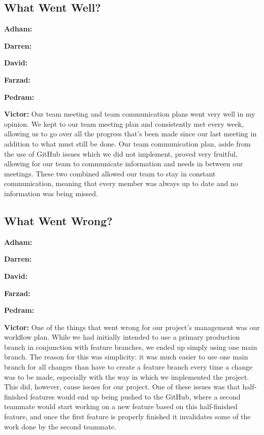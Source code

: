 \documentclass{article}
\begin{document}
\subsection{What Went Well?}

\textbf{Adham:}

\textbf{Darren:}

\textbf{David:}

\textbf{Farzad:}

\textbf{Pedram:}

\textbf{Victor:} Our team meeting and team communication plans went very well in my opinion. We kept to our team meeting plan and consistently met every week, allowing us to go over all the progress that's been made since our last meeting in addition to what must still be done. Our team communication plan, aside from the use of GitHub issues which we did not implement, proved very fruitful, allowing for our team to communicate information and needs in between our meetings. These two combined allowed our team to stay in constant communication, meaning that every member was always up to date and no information was being missed.

\subsection{What Went Wrong?}

\textbf{Adham:}

\textbf{Darren:}

\textbf{David:}

\textbf{Farzad:}

\textbf{Pedram:}

\textbf{Victor:} One of the things that went wrong for our project's management was our workflow plan. While we had initially intended to use a primary production branch in conjunction with feature branches, we ended up simply using one main branch. The reason for this was simplicity: it was much easier to use one main branch for all changes than have to create a feature branch every time a change was to be made, especially with the way in which we implemented the project. This did, however, cause issues for our project. One of these issues was that half-finished features would end up being pushed to the GitHub, where a second teammate would start working on a new feature based on this half-finished feature, and once the first feature is properly finished it invalidates some of the work done by the second teammate.
\end{document}
